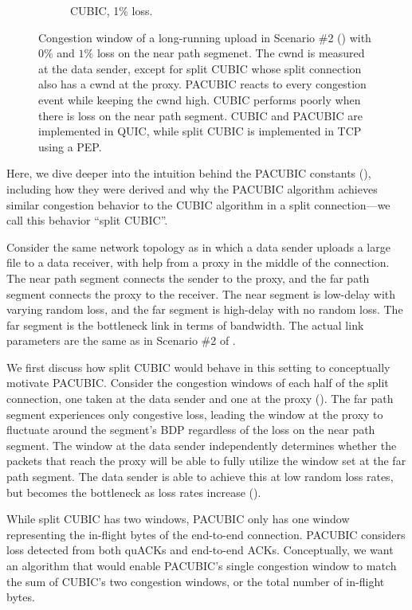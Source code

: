 \begin{figure}[h]
\begin{subfigure}{0.32\linewidth}
	\caption{CUBIC, 1\% loss.}
	\label{fig:time-cwnd:cubic-loss1p}
\end{subfigure}
\caption{Congestion window of a long-running upload in Scenario \#2
() with $0\%$ and $1\%$ loss on the near
path segmenet.
The cwnd is measured at the data sender,
except for split CUBIC whose split connection also has a cwnd at the proxy.
PACUBIC reacts to every congestion event while keeping the cwnd high.
CUBIC performs poorly when there is loss on the near path segment.
CUBIC and PACUBIC are implemented in QUIC, while split CUBIC is implemented
in TCP using a PEP.
}
\label{fig:time-cwnd}
\end{figure}

Here, we dive deeper into the intuition behind the PACUBIC constants
(), including how they were derived and why the PACUBIC
algorithm achieves similar congestion behavior to the CUBIC algorithm in a split
connection---we call this behavior ``split CUBIC''.

Consider the same network topology as  in which a
data sender uploads a large file to a data receiver, with help from a \sys
proxy in the middle of the connection. The near path segment connects the sender
to the proxy, and the far path segment connects the proxy to the receiver.
The near segment is low-delay with varying random loss, and the far segment is
high-delay with no random loss. The far segment is the bottleneck link in terms
of bandwidth.
The actual link parameters are the same as in Scenario \#2 of
.

We first discuss how split CUBIC would behave in this setting to conceptually
motivate PACUBIC.
Consider the congestion windows of each half of the
split connection, one taken at the data sender and one at the proxy
().
The far path segment experiences only congestive loss,
leading the window at the proxy to fluctuate around the segment's BDP
regardless of the loss on the near path segment.
The window at the data sender independently determines whether the packets
that reach the proxy will be able to fully utilize the window set at the far
path segment. The data sender is able to achieve this at low random loss rates, but
becomes the bottleneck as loss rates increase ().

While split CUBIC has two windows, PACUBIC only has one
window representing the in-flight bytes of the end-to-end connection.
PACUBIC considers loss detected from both quACKs and end-to-end ACKs.
Conceptually, we want an algorithm that would enable PACUBIC's single
congestion window to match the sum of CUBIC's two congestion windows, or
the total number of in-flight bytes.

